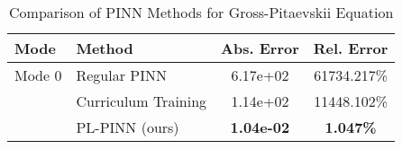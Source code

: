 \begin{table}[htbp]
\centering
\caption{Comparison of PINN Methods for Gross-Pitaevskii Equation}
\label{tab:pinn_comparison}
\begin{tabular}{llcc}
\toprule
Mode & Method & Abs. Error & Rel. Error \\
\midrule
Mode 0 & Regular PINN & 6.17e+02 & 61734.217\% \\
 & Curriculum Training & 1.14e+02 & 11448.102\% \\
 & PL-PINN (ours) & \textbf{1.04e-02} & \textbf{1.047\%} \\
\bottomrule
\end{tabular}
\end{table}